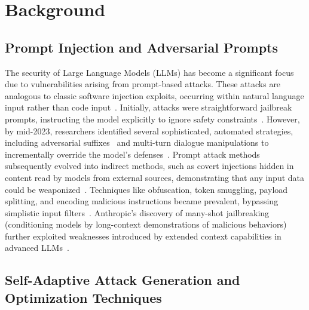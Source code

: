 \documentclass[manuscript,screen,review]{acmart}
\begin{document}
\section{Background}

\subsection{Prompt Injection and Adversarial Prompts}

The security of Large Language Models (LLMs) has become a significant focus due to vulnerabilities arising from prompt-based attacks. These attacks are analogous to classic software injection exploits, occurring within natural language input rather than code input~\cite{arthur2024promptinjection, lakera2024promptguide}. Initially, attacks were straightforward jailbreak prompts, instructing the model explicitly to ignore safety constraints~\cite{arthur2024promptinjection}. However, by mid-2023, researchers identified several sophisticated, automated strategies, including adversarial suffixes~\cite{zou2023universal} and multi-turn dialogue manipulations to incrementally override the model's defenses~\cite{zou2024oneshot}. Prompt attack methods subsequently evolved into indirect methods, such as covert injections hidden in content read by models from external sources, demonstrating that any input data could be weaponized~\cite{lakera2024promptguide, venturebeat2024prompt}. Techniques like obfuscation, token smuggling, payload splitting, and encoding malicious instructions became prevalent, bypassing simplistic input filters~\cite{learnprompting2024obfuscation}. Anthropic’s discovery of many-shot jailbreaking (conditioning models by long-context demonstrations of malicious behaviors) further exploited weaknesses introduced by extended context capabilities in advanced LLMs~\cite{anthropic2024manyshot}.

\subsection{Self-Adaptive Attack Generation and Optimization Techniques}
\end{document}
